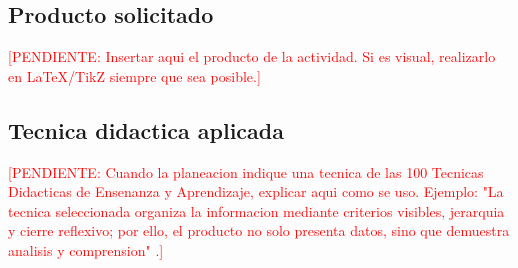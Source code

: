 \documentclass[
	spanish,
	letterpaper, oneside
]{article}
\newcommand{\pendiente}[1]{\textcolor{red}{[PENDIENTE: #1]}}
\begin{document}
\subsection{Producto solicitado}

\pendiente{Insertar aqui el producto de la actividad. Si es visual, realizarlo en LaTeX/TikZ siempre que sea posible.}

\subsection{Tecnica didactica aplicada}

\pendiente{Cuando la planeacion indique una tecnica de las 100 Tecnicas Didacticas de Ensenanza y Aprendizaje, explicar aqui como se uso. Ejemplo: "La tecnica seleccionada organiza la informacion mediante criterios visibles, jerarquia y cierre reflexivo; por ello, el producto no solo presenta datos, sino que demuestra analisis y comprension" \citep{unadm100TecnicasDidacticas2023}.}

%
\end{document}
